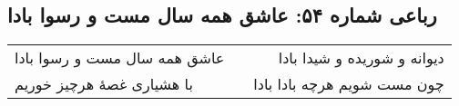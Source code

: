 \begin{center}
\section*{رباعی شماره ۵۴: عاشق همه سال مست و رسوا بادا}
\label{sec:0054}
\begin{longtable}{l p{0.5cm} r}
عاشق همه سال مست و رسوا بادا
&&
دیوانه و شوریده و شیدا بادا
\\
با هشیاری غصهٔ هرچیز خوریم
&&
چون مست شویم هرچه بادا بادا
\\
\end{longtable}
\end{center}
